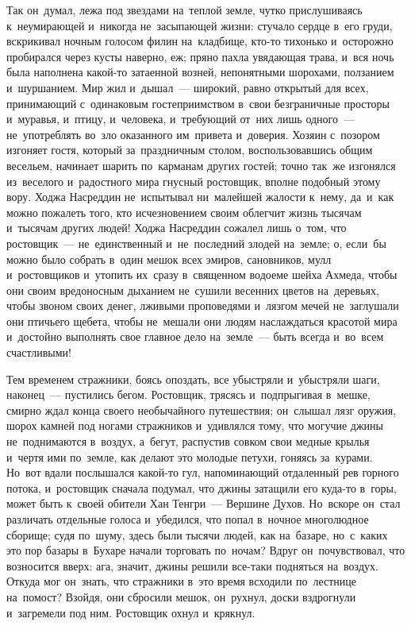 \documentclass[12pt,a4paper]{book}
\begin{document}
Так он~думал, лежа под звездами на~теплой земле, чутко прислушиваясь к~неумирающей и~никогда не~засыпающей жизни: стучало сердце в~его груди, вскрикивал ночным голосом филин на~кладбище, кто-то тихонько и~осторожно пробирался через кусты наверно, еж; пряно пахла увядающая трава, и~вся ночь была наполнена какой-то затаенной возней, непонятными шорохами, ползанием и~шуршанием. Мир жил и~дышал~— широкий, равно открытый для всех, принимающий с~одинаковым гостеприимством в~свои безграничные просторы и~муравья, и~птицу, и~человека, и~требующий от~них лишь одного~— не~употреблять во~зло оказанного им~привета и~доверия. Хозяин с~позором изгоняет гостя, который за~праздничным столом, воспользовавшись общим весельем, начинает шарить по~карманам других гостей; точно так~же изгонялся из~веселого и~радостного мира гнусный ростовщик, вполне подобный этому вору. Ходжа Насреддин не~испытывал ни~малейшей жалости к~нему, да~и~как можно пожалеть того, кто исчезновением своим облегчит жизнь тысячам и~тысячам других людей! Ходжа Насреддин сожалел лишь о~том, что ростовщик~— не~единственный и~не~последний злодей на~земле; о, если~бы можно было собрать в~один мешок всех эмиров, сановников, мулл и~ростовщиков и~утопить их~сразу в~священном водоеме шейха Ахмеда, чтобы они своим вредоносным дыханием не~сушили весенних цветов на~деревьях, чтобы звоном своих денег, лживыми проповедями и~лязгом мечей не~заглушали они птичьего щебета, чтобы не~мешали они людям наслаждаться красотой мира и~достойно выполнять свое главное дело на~земле~— быть всегда и~во~всем счастливыми!

Тем временем стражники, боясь опоздать, все убыстряли и~убыстряли шаги, наконец~— пустились бегом. Ростовщик, трясясь и~подпрыгивая в~мешке, смирно ждал конца своего необычайного путешествия; он~слышал лязг оружия, шорох камней под ногами стражников и~удивлялся тому, что могучие джины не~поднимаются в~воздух, а~бегут, распустив совком свои медные крылья и~чертя ими по~земле, как делают это молодые петухи, гоняясь за~курами. Но~вот вдали послышался какой-то гул, напоминающий отдаленный рев горного потока, и~ростовщик сначала подумал, что джины затащили его куда-то в~горы, может быть к~своей обители Хан Тенгри~— Вершине Духов. Но~вскоре он~стал различать отдельные голоса и~убедился, что попал в~ночное многолюдное сборище; судя по~шуму, здесь были тысячи людей, как на~базаре, но~с~каких это пор базары в~Бухаре начали торговать по~ночам? Вдруг он~почувствовал, что возносится вверх: ага, значит, джины решили все-таки подняться на~воздух. Откуда мог он~знать, что стражники в~это время всходили по~лестнице на~помост? Взойдя, они сбросили мешок, он~рухнул, доски вздрогнули и~загремели под ним. Ростовщик охнул и~крякнул.
\end{document}
